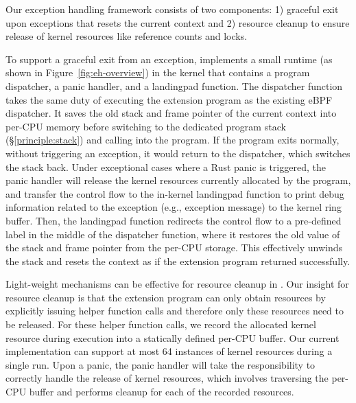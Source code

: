 Our exception handling framework consists of two components: 1) graceful exit
    upon exceptions that resets the current context and 2) resource cleanup to
    ensure release of kernel resources like reference counts and locks.

To support a graceful exit from an exception, \projname{} implements a small
    runtime (as shown in Figure~\ref{fig:eh-overview}) in the kernel that
    contains a program dispatcher, a panic handler, and a landingpad function.
The dispatcher function takes the same duty of executing the extension program
    as the existing eBPF dispatcher.
It saves the old stack and frame pointer of the current context into per-CPU
    memory before switching to the dedicated program stack
    (\S\ref{principle:stack}) and calling into the program.
If the program exits normally, without triggering an exception, it would
    return to the dispatcher, which switches the stack back.
Under exceptional cases where a Rust panic is triggered, the panic handler will
    release the kernel resources currently allocated by the program, and
    transfer the control flow to the in-kernel landingpad function to print
    debug information related to the exception (e.g., exception message) to the
    kernel ring buffer.
Then, the landingpad function redirects the control flow to a pre-defined label
    in the middle of the dispatcher function, where it restores the old value
    of the stack and frame pointer from the per-CPU storage.
This effectively unwinds the stack and resets the context as if the extension
    program returned successfully.

Light-weight mechanisms can be effective for resource cleanup in \projname{}.
Our insight for resource cleanup is that the extension program can only obtain
    resources by explicitly issuing helper function calls and therefore only
    these resources need to be released.
For these helper function calls, we record the allocated kernel resource during
    execution into a statically defined per-CPU buffer.
Our current implementation can support at most 64
    instances of kernel resources during a single run.
Upon a panic, the panic handler will take the responsibility to correctly
    handle the release of kernel resources, which involves traversing the
    per-CPU buffer and performs cleanup for each of the recorded resources.

